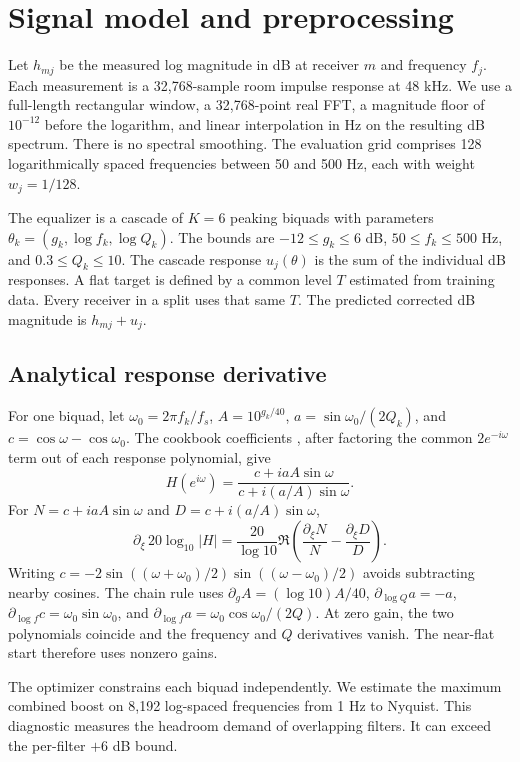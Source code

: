 \documentclass[11pt,letterpaper]{article}
\begin{document}
\clearpage
\section{Signal model and preprocessing}
Let $h_{mj}$ be the measured log magnitude in dB at receiver $m$ and
frequency $f_j$. Each measurement is a 32,768-sample room impulse response
at 48 kHz. We use a full-length rectangular window, a 32,768-point real FFT, a
magnitude floor of $10^{-12}$ before the logarithm, and linear interpolation
in Hz on the resulting dB spectrum. There is no spectral smoothing.
The evaluation grid comprises 128 logarithmically spaced frequencies between
50 and 500 Hz, each with weight $w_j=1/128$.

The equalizer is a cascade of $K=6$ peaking biquads with parameters
$\theta_k=(g_k,\log f_k,\log Q_k)$. The bounds are
$-12\leq g_k\leq6$ dB, $50\leq f_k\leq500$ Hz, and $0.3\leq Q_k\leq10$.
The cascade response $u_j(\theta)$ is the sum of the individual dB
responses. A flat target is defined by a common level $T$ estimated from
training data. Every receiver in a split uses that same $T$. The predicted
corrected dB magnitude is $h_{mj}+u_j$.

\subsection{Analytical response derivative}
For one biquad, let $\omega_0=2\pi f_k/f_s$, $A=10^{g_k/40}$,
$a=\sin\omega_0/(2Q_k)$, and $c=\cos\omega-\cos\omega_0$.
The cookbook coefficients \cite{rbj}, after factoring the common
$2e^{-i\omega}$ term out of each response polynomial, give
\[
  H(e^{i\omega})=\frac{c+i a A\sin\omega}{c+i(a/A)\sin\omega}.
\]
For $N=c+i a A\sin\omega$ and $D=c+i(a/A)\sin\omega$,
\[
  \partial_\xi\,20\log_{10}|H|
    =\frac{20}{\log 10}\Re\!\left(\frac{\partial_\xi N}{N}
                         -\frac{\partial_\xi D}{D}\right).
\]
Writing $c=-2\sin((\omega+\omega_0)/2)\sin((\omega-\omega_0)/2)$
avoids subtracting nearby cosines. The chain rule uses
$\partial_g A=(\log 10) A/40$,
$\partial_{\log Q}a=-a$,
$\partial_{\log f}c=\omega_0\sin\omega_0$, and
$\partial_{\log f}a=\omega_0\cos\omega_0/(2Q)$.
At zero gain, the two polynomials coincide and the frequency and $Q$
derivatives vanish. The near-flat start therefore uses nonzero gains.

The optimizer constrains each biquad independently. We estimate the
maximum combined boost on 8,192 log-spaced frequencies from 1 Hz to
Nyquist. This diagnostic measures the headroom demand of overlapping
filters. It can exceed the per-filter $+6$ dB bound.
\end{document}
